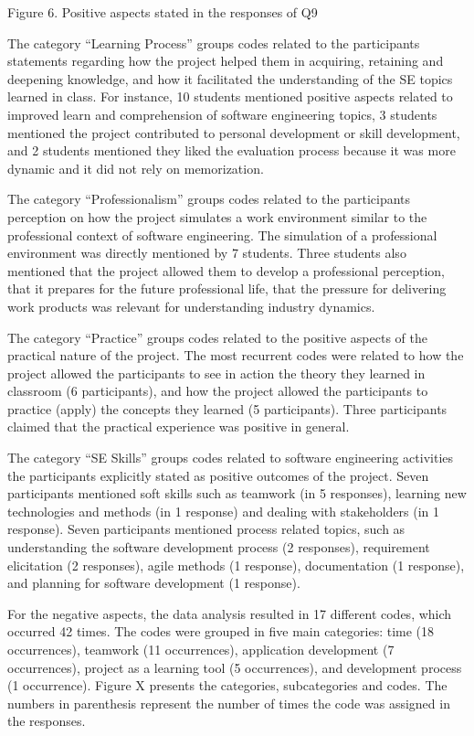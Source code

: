 Figure 6. Positive aspects stated in the responses of Q9

The category “Learning Process” groups codes related to the participants statements regarding how the project helped them in acquiring, retaining and deepening knowledge, and how it facilitated the understanding of the SE topics learned in class. For instance, 10 students mentioned positive aspects related to improved learn and comprehension of software engineering topics, 3 students mentioned the project contributed to personal development or skill development, and 2 students mentioned they liked the evaluation process because it was more dynamic and it did not rely on memorization.

The category “Professionalism” groups codes related to the participants perception on how the project simulates a work environment similar to the professional context of software engineering. The simulation of a professional environment was directly mentioned by 7 students. Three students also mentioned that the project allowed them to develop a professional perception, that it prepares for the future professional life, that the pressure for delivering work products was relevant for understanding industry dynamics.

The category “Practice” groups codes related to the positive aspects of the practical nature of the project. The most recurrent codes were related to how the project allowed the participants to see in action the theory they learned in classroom (6 participants), and how the project allowed the participants to practice (apply) the concepts they learned (5 participants). Three participants claimed that the practical experience was positive in general.

The category “SE Skills” groups codes related to software engineering activities the participants explicitly stated as positive outcomes of the project. Seven participants mentioned soft skills such as teamwork (in 5 responses), learning new technologies and methods (in 1 response) and dealing with stakeholders (in 1 response). Seven participants mentioned process related topics, such as understanding the software development process (2 responses), requirement elicitation (2 responses), agile methods (1 response), documentation (1 response), and planning for software development (1 response).

For the negative aspects, the data analysis resulted in 17 different codes, which occurred 42 times. The codes were grouped in five main categories: time (18 occurrences), teamwork (11 occurrences), application development (7 occurrences), project as a learning tool (5 occurrences), and development process (1 occurrence). Figure X presents the categories, subcategories and codes. The numbers in parenthesis represent the number of times the code was assigned in the responses.   

